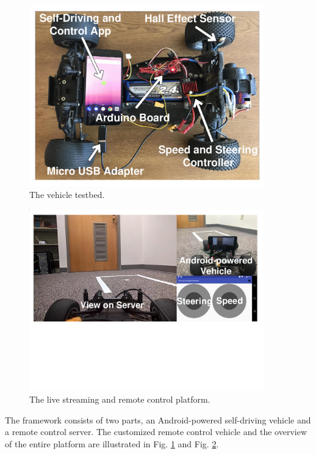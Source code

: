 

\begin{figure}[t]
\centering
  \includegraphics[width=4.0in,angle=0]{Figs/RTDrive/rc_car.pdf}
\vspace{-0.2cm}
\caption{The vehicle testbed.}
\vspace{-0.5cm}
\label{rc_vehicle}
\end{figure}

\begin{figure}[!ht]
\centering
  \includegraphics[width=4.0in,angle=0]{Figs/RTDrive/rc_car_cropped.pdf}
\vspace{-0.2cm}
\caption{The live streaming and remote control platform.}
\vspace{-0.2cm}
\label{platform}
\end{figure}


The framework consists of two parts, an Android-powered 
self-driving vehicle and a remote control server. 
The customized remote control vehicle
and the overview of the entire platform are illustrated in Fig. \ref{rc_vehicle} and Fig. \ref{platform}.


